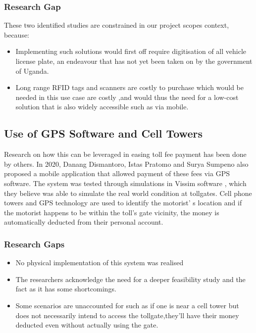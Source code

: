 \subsubsection{Research Gap}
These two identified studies are constrained in our project scope\’s context, because:
\begin{itemize}
    \item Implementing such solutions would first off require digitisation of all vehicle license plate, an endeavour that has not yet been taken on by the government of Uganda.
    \item Long range RFID tags and scanners are costly to purchase which would be needed in this use case are costly ,and would thus the need for a low-cost solution that is also widely accessible such as via mobile.
\end{itemize}



\clearpage

\subsection{Use of GPS Software and Cell Towers}
Research on how this can be leveraged in easing toll fee payment has been done by others. In 2020, Danang Dismantoro, Istas Pratomo and Surya Sumpeno also proposed a mobile application that allowed payment of these fees via GPS software\cite{el-rabbany_introduction_2002,dismantoro_minimizing_2020}. The system was tested through simulations in Vissim software \cite{ptv_vissim_traffic_2022}, which they believe was able to simulate the real world condition at tollgates. Cell phone towers and GPS technology are used to identify the motorist’ s location and if the motorist happens to be within the toll’s gate vicinity, the money is automatically deducted from their personal account.

\subsubsection{Research Gaps}
\begin{itemize}
    \item No physical implementation of this system was realised
    \item The researchers acknowledge the need for a deeper feasibility study and the fact as it has some shortcomings.
    \item Some scenarios are unaccounted for such as if one is near a cell tower but does not necessarily intend to access the tollgate,they’ll have their money deducted even without actually using the gate.
\end{itemize}


